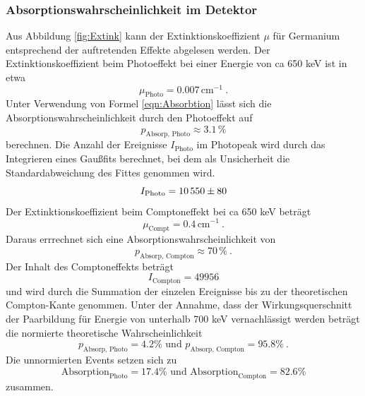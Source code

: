 \subsubsection{Absorptionswahrscheinlichkeit im Detektor}
Aus Abbildung \ref{fig:Extink} kann der Extinktionskoeffizient $\mu$ für Germanium entsprechend der auftretenden Effekte abgelesen werden. Der Extinktionskoeffizient beim Photoeffekt bei einer Energie von ca 650 keV ist in etwa
\begin{equation}
  \mu_\text{Photo} = 0.007 \, \text{cm} ^{-1} \ .
  \label{eqn:muPhoto}
\end{equation}
Unter Verwendung von Formel \ref{eqn:Absorbtion} lässt sich die Absorptionswahrscheinlichkeit durch den Photoeffekt auf
\begin{equation}
  p_\text{Absorp, Photo} \approx 3.1 \, \%
  \label{eqn:AbsorpPhoto}
\end{equation}
berechnen. Die Anzahl der Ereignisse $I_\text{Photo}$ im Photopeak wird durch das Integrieren eines Gaußfits berechnet, bei dem als Unsicherheit die Standardabweichung des Fittes genommen wird.
\begin{equation}
  I_\text{Photo} = \num{10550 +- 80}
  \label{eqn:iPhoto}
\end{equation}
Der Extinktionskoeffizient beim Comptoneffekt bei ca 650 keV beträgt
\begin{equation}
  \mu_\text{Compt} = 0.4 \, \text{cm} ^{-1} \ .
  \label{eqn:muCompt}
\end{equation}
Daraus errrechnet sich eine Absorptionswahrscheinlichkeit von
\begin{equation}
  p_\text{Absorp, Compton} \approx 70 \, \% \ .
  \label{eqn:AbsorpComp}
\end{equation}
Der Inhalt des Comptoneffekts beträgt 
\begin{equation}
  I_\text{Compton} = 49956
  \label{eqn:iComp}
\end{equation}
und wird durch die Summation der einzelen Ereignisse bis zu der theoretischen Compton-Kante genommen. Unter der Annahme, dass der Wirkungsquerschnitt der Paarbildung für Energie von unterhalb 700 keV vernachlässigt werden beträgt die normierte theoretische Wahrscheinlichkeit 
\begin{equation}
  p_\text{Absorp, Photo} = 4.2 \% \text{ und } p_\text{Absorp, Compton} = 95.8 \% \ .  
  \label{eqn:pNorm}
\end{equation}
Die unnormierten Events setzen sich zu 
\begin{equation}
  \text{Absorption}_\text{Photo} = 17.4 \% \text{ und } \text{Absorption}_\text{Compton} = 82.6 \%
  \label{eqn:expNorm}
\end{equation}
zusammen. 
